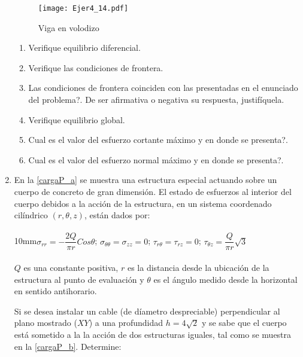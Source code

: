 \documentclass[../notas medios.tex]{subfiles}
\begin{document}
\begin{enumerate}
\begin{figure}[H]
	\centering
	\texttt{[image: Ejer4\_14.pdf]} 
	\caption{Viga en volodizo}
	\label{viga:voladizo}
\end{figure}
%
	\begin{enumerate}
		\item Verifique equilibrio diferencial.
		\item Verifique las condiciones de frontera.
		\item \textquestiondown Las condiciones de frontera coinciden con las presentadas en el enunciado del problema?. De ser afirmativa o negativa su respuesta, justif\'iquela.
		\item Verifique equilibrio global.
		\item \textquestiondown Cual es el valor del esfuerzo cortante m\'aximo y en donde se presenta?. 
		\item \textquestiondown Cual es el valor del esfuerzo normal m\'aximo y en donde se presenta?.
	\end{enumerate}
%
\item \label{punto15} En la \cref{cargaP_a} se muestra una estructura
especial actuando sobre un cuerpo de concreto de gran dimensi\'on. El estado de esfuerzos al interior del cuerpo debidos a la acci\'on de la estructura, en un sistema coordenado cil\'indrico $(r,{\theta},z)$, est\'an dados por:\\\\
%
{10mm}$\sigma_{rr}= -\dfrac{2Q}{\pi r} Cos \theta$; \hspace*{5mm}
	$\sigma_{\theta\theta} = \sigma_{zz} = 0$; \hspace*{5mm}
	$\tau_{r\theta}= \tau_{rz}= 0 $; \hspace*{5mm}
	$\tau_{\theta{z}} = \dfrac{Q}{\pi r} \sqrt{3}$ \\\\
%
$Q$ es una constante positiva, $r$ es la distancia desde la ubicaci\'on de la estructura al punto de evaluaci\'on y $\theta$ es el \'angulo medido desde la horizontal en sentido antihorario. 
%
\begin{figure}[H]
	\centering
		\hspace{1.0cm}
	\label{cargaP_concreto} 
\end{figure}
%
Si se desea instalar un cable (de d\'iametro despreciable) perpendicular al plano mostrado ($XY$) a una profundidad $h = 4 \sqrt{2}$ y se sabe que el cuerpo está sometido a la 
 la acci\'on de dos estructuras iguales, tal como se muestra en la \cref{cargaP_b}. Determine: \\


\end{enumerate}
\end{document}
